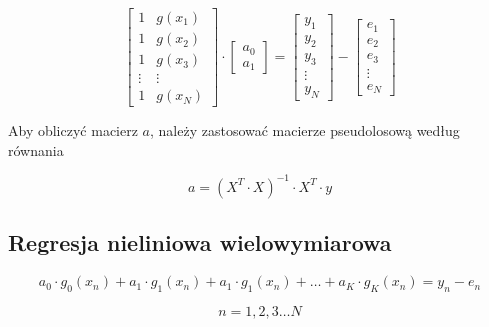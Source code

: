 \begin{equation*}
    \begin{bmatrix}
            1 & g(x_1)\\
            1 & g(x_2)\\
            1 & g(x_3)\\
            \vdots & \vdots \\ 
            1 & g(x_N) 
    \end{bmatrix}
\cdot \begin{bmatrix}
    a_0 \\ a_1 
\end{bmatrix}
 = \begin{bmatrix}
    y_1 \\ y_2 \\ y_3 \\ \vdots \\ y_N
\end{bmatrix} - \begin{bmatrix}
    e_1\\e_2\\e_3\\\vdots\\e_N
\end{bmatrix}
\end{equation*}

Aby obliczyć macierz $a$, należy zastosować macierze pseudolosową
według równania

\begin{equation*}
a = ( X^T \cdot X)^{-1} \cdot X^T \cdot y
\end{equation*}

\subsection*{Regresja nieliniowa wielowymiarowa}

\begin{equation*}
    a_0 \cdot g_0(x_n) + a_1 \cdot g_1(x_n) + a_1 \cdot g_1(x_n) + \hdots + a_K \cdot g_K(x_n) = y_n - e_n 
\end{equation*}

\begin{equation*}
    n = 1, 2, 3 \hdots N
\end{equation*}

